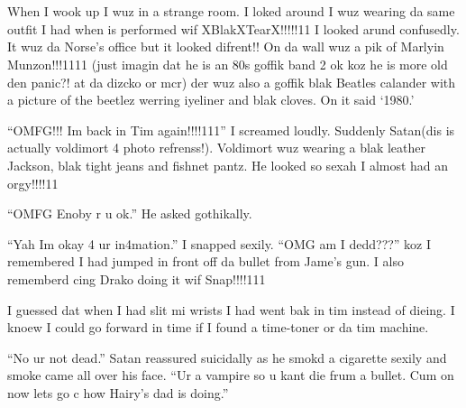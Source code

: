 \section{}



When I wook up I wuz in a strange room. I loked around I wuz wearing da same outfit I had when is performed wif XBlakXTearX!!!!!11 I looked arund confusedly. It wuz da Norse's office but it looked difrent!! On da wall wuz a pik of Marlyin Munzon!!!1111 (just imagin dat he is an 80s goffik band 2 ok koz he is more old den panic?! at da dizcko or mcr) der wuz also a goffik blak Beatles calander with a picture of the beetlez werring iyeliner and blak cloves. On it said \enquote*{1980.}

\enquote{OMFG!!! Im back in Tim again!!!!111} I screamed loudly. Suddenly Satan(dis is actually voldimort 4 photo refrenss!). Vol\-di\-mort wuz wearing a blak leather Jackson, blak tight jeans and fishnet pantz. He looked so sexah I almost had an orgy!!!!11

\enquote{OMFG Enoby r u ok.} He asked gothikally.

\enquote{Yah Im okay 4 ur in4mation.} I snapped sexily. \enquote{OMG am I dedd???} koz I remembered I had jumped in front off da bullet from Jame's gun. I also rememberd cing Drako doing it wif Snap!!!!111

I guessed dat when I had slit mi wrists I had went bak in tim instead of dieing. I knoew I could go forward in time if I found a time-toner or da tim machine.

\enquote{No ur not dead.} Satan reassured suicidally as he smokd a cigarette sexily and smoke came all over his face. \enquote{Ur a vampire so u kant die frum a bullet. Cum on now lets go c how Hairy's dad is doing.}

